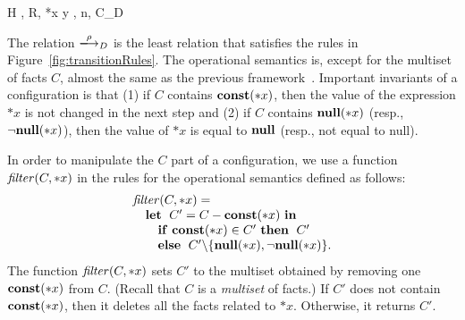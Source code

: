 \begin{figure*}
\begin{minipage}{\textwidth}
{ \langle H , R, *x \leftarrow y , n, C\rangle \xlongrightarrow{}_{D}
  \CONSTEX}



\end{minipage}

\caption{Operational semantics of \(\mathcal{L}\).}
\label{fig:transitionRules}
\end{figure*}

The relation $\xlongrightarrow{\rho}_D$ is the least relation that
satisfies the rules in Figure~\ref{fig:transitionRules}.  The
operational semantics is, except for the multiset of facts $C$, almost
the same as the previous framework~\cite{tanPPL2015}.  Important
invariants of a configuration is that (1) if $C$ contains $\mathbf{const}(*x)$,
then the value of the expression $*x$ is not changed in the next step
and (2) if $C$ contains $\mathbf{null}(*x)$ (resp., $\neg\mathbf{null}(*x)$), then the value of
$*x$ is equal to $\mathbf{null}$ (resp., not equal to null).

In order to manipulate the $C$ part of a configuration, we use a
function $\mathit{filter}(C, *x)$ in the rules for the operational semantics
defined as follows:
\[
\begin{array}{l}
 \mathit{filter}(C, *x) =\\
 \quad \mathbf{let}\;\ C' = C - \mathbf{const}(*x)\ \mathbf{in}\;\\
 \quad\quad \mathbf{if}\ \mathbf{const}(*x) \in C'\ \mathbf{then}\;\ C'\\
 \quad\quad \mathbf{else}\;\ C'\backslash\{\mathbf{null}(*x),\neg\mathbf{null}(*x)\}.
\end{array}
\]
The function $\mathit{filter}(C, *x)$ sets $C'$ to the multiset obtained by
removing one $\mathbf{const}(*x)$ from $C$.  (Recall that $C$ is a
\emph{multiset} of facts.)  If $C'$ does not contain $\mathbf{const}(*x)$, then
it deletes all the facts related to $*x$.  Otherwise, it returns $C'$.

